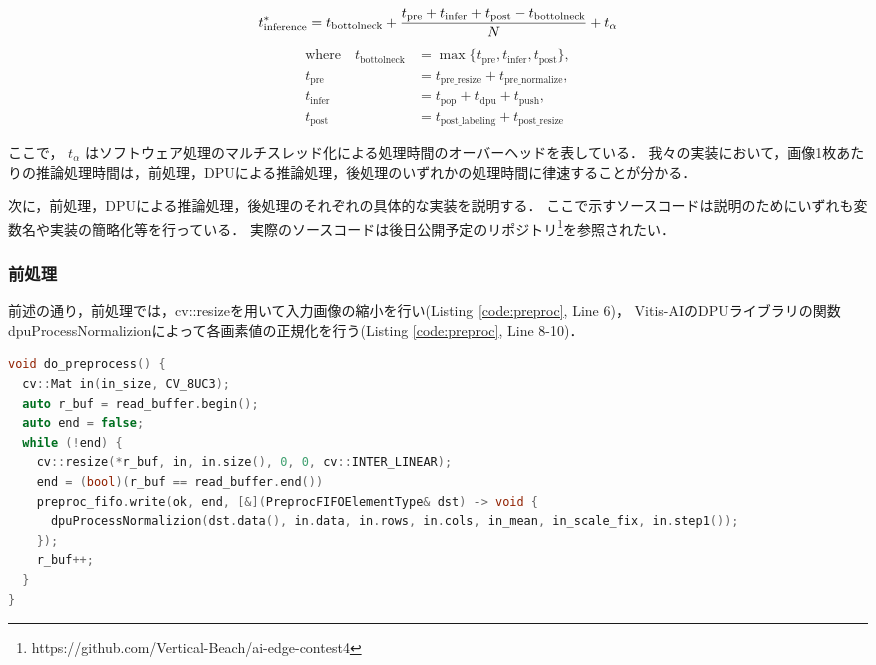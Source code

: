 \begin{equation}
  \label{equ:inference-pred}
    t_{\mathrm{inference}}^* = t_{\mathrm{bottolneck}} + \frac{t_{\mathrm{pre}} + t_{\mathrm{infer}} + t_{\mathrm{post}} - t_{\mathrm{bottolneck}}}{N} + t_\alpha \\
\end{equation}
\begin{equation*}
    \begin{split}
      \text{where} \quad
      t_{\mathrm{bottolneck}}  &= \max \{t_{\mathrm{pre}}, t_{\mathrm{infer}}, t_{\mathrm{post}}\}, \\
      t_{\mathrm{pre}}  &= t_{\mathrm{pre\_resize}} + t_{\mathrm{pre\_normalize}}, \\
      t_{\mathrm{infer}} &= t_{\mathrm{pop}} + t_{\mathrm{dpu}} + t_{\mathrm{push}}, \\
      t_{\mathrm{post}} &= t_{\mathrm{post\_labeling}} + t_{\mathrm{post\_resize}}
    \end{split}
\end{equation*}

ここで， $t_\alpha$ はソフトウェア処理のマルチスレッド化による処理時間のオーバーヘッドを表している．
我々の実装において，画像1枚あたりの推論処理時間は，前処理，DPUによる推論処理，後処理のいずれかの処理時間に律速することが分かる．

次に，前処理，DPUによる推論処理，後処理のそれぞれの具体的な実装を説明する．
ここで示すソースコードは説明のためにいずれも変数名や実装の簡略化等を行っている．
実際のソースコードは後日公開予定のリポジトリ\footnote{https://github.com/Vertical-Beach/ai-edge-contest4}を参照されたい．

\subsubsection{前処理}
前述の通り，前処理では，cv::resizeを用いて入力画像の縮小を行い(Listing \ref{code:preproc}, Line 6)，
Vitis-AIのDPUライブラリの関数dpuProcessNormalizionによって各画素値の正規化を行う(Listing \ref{code:preproc}, Line 8-10)．

\setcounter{lstnumber}{1}
\begin{lstlisting}[language=c++,firstnumber=last,caption=do\_preprocess(),label=code:preproc]
void do_preprocess() {
  cv::Mat in(in_size, CV_8UC3);
  auto r_buf = read_buffer.begin();
  auto end = false;
  while (!end) {
    cv::resize(*r_buf, in, in.size(), 0, 0, cv::INTER_LINEAR);
    end = (bool)(r_buf == read_buffer.end())
    preproc_fifo.write(ok, end, [&](PreprocFIFOElementType& dst) -> void {
      dpuProcessNormalizion(dst.data(), in.data, in.rows, in.cols, in_mean, in_scale_fix, in.step1());
    });
    r_buf++;
  }
}
\end{lstlisting}


